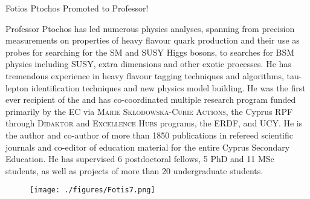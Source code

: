 \begin{headline}[enhanced, tikz={rotate=0}, width=0.48\textwidth]{Fotios Ptochos Promoted to Professor!}
\begin{multicols}{3}
    Professor Ptochos has led numerous physics analyses, spanning
    from precision measurements on properties of heavy flavour quark
    production and their use as probes for searching for the SM and SUSY
    Higgs bosons, to searches for BSM physics including SUSY, extra
    dimensions and other exotic processes. He has tremendous experience in
    heavy flavour tagging techniques and algorithms, tau-lepton
    identification techniques and new physics model building. 
    He was the first ever recipient of the  and has co-coordinated multiple research program
    funded primarily by the EC via \textsc{Marie
      Skłodowska-Curie Actions}, the Cyprus RPF through
    \textsc{Didaktor} and \textsc{Excellence Hubs} programs, the ERDF,
    and UCY. He is the author and co-author of more than 
    1850 publications in refereed scientific journals and co-editor of
    education material for the entire Cyprus Secondary Education. He has
    supervised 6 postdoctoral fellows, 5
    PhD and 11 MSc students, as well as projects of more than 20
    undergraduate students.  
    \begin{figure}
      \begin{center}
        \leavevmode
        \texttt{[image: ./figures/Fotis7.png]}
      \end{center}
    \end{figure}
  \end{multicols}
\end{headline}

